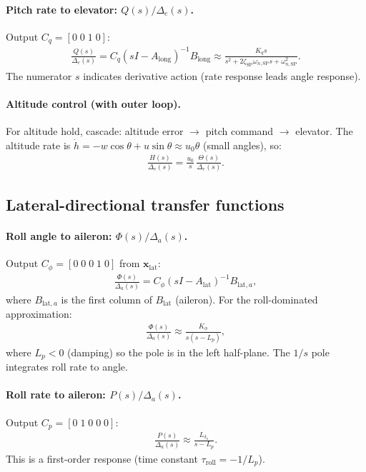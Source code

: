 \documentclass[11pt]{article}
\begin{document}
\paragraph{Pitch rate to elevator: $Q(s)/\Delta_e(s)$.}
Output $C_q=[0\;0\;1\;0]$:
\begin{align}
\frac{Q(s)}{\Delta_e(s)} = C_q(sI-A_{\text{long}})^{-1}B_{\text{long}}
\approx \frac{K_q s}{s^2+2\zeta_{\text{SP}}\omega_{n,\text{SP}}s+\omega_{n,\text{SP}}^2}.
\end{align}
The numerator $s$ indicates derivative action (rate response leads angle response).

\paragraph{Altitude control (with outer loop).}
For altitude hold, cascade: altitude error $\to$ pitch command $\to$ elevator. The altitude rate is $\dot h = -w\cos\theta + u\sin\theta\approx u_0\theta$ (small angles), so:
\begin{align}
\frac{H(s)}{\Delta_e(s)} = \frac{u_0}{s}\,\frac{\Theta(s)}{\Delta_e(s)}.
\end{align}

\subsection{Lateral-directional transfer functions}

\paragraph{Roll angle to aileron: $\Phi(s)/\Delta_a(s)$.}
Output $C_\phi=[0\;0\;0\;1\;0]$ from $\mathbf{x}_{\text{lat}}$:
\begin{align}
\frac{\Phi(s)}{\Delta_a(s)} = C_\phi(sI-A_{\text{lat}})^{-1}B_{\text{lat},a},
\end{align}
where $B_{\text{lat},a}$ is the first column of $B_{\text{lat}}$ (aileron). For the roll-dominated approximation:
\begin{align}
\frac{\Phi(s)}{\Delta_a(s)} \approx \frac{K_\phi}{s(s-L_p)},
\end{align}
where $L_p<0$ (damping) so the pole is in the left half-plane. The $1/s$ pole integrates roll rate to angle.

\paragraph{Roll rate to aileron: $P(s)/\Delta_a(s)$.}
Output $C_p=[0\;1\;0\;0\;0]$:
\begin{align}
\frac{P(s)}{\Delta_a(s)} \approx \frac{L_{\delta_a}}{s-L_p}.
\end{align}
This is a first-order response (time constant $\tau_{\text{roll}}=-1/L_p$).
\end{document}
